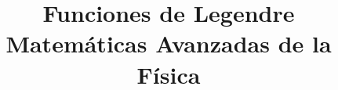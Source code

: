 
\author{}
\title{Funciones de Legendre \\ {\large Matemáticas Avanzadas de la Física}}
\date{ }

\maketitle
\fontsize{14}{14}\selectfont
